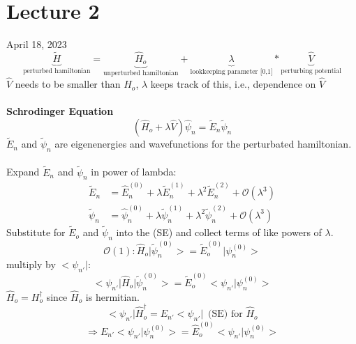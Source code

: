 \documentclass[12pt,fancychapters]{report}
\numberwithin{equation}{section}
\begin{document}
\section{Lecture 2}
April 18, 2023
$$\underbrace{\tilde{H}}_\text{perturbed hamiltonian} = \underbrace{\hat{H}_o}_\text{unperturbed hamiltonian}
+ \underbrace{\lambda}_\text{lookkeeping parameter [0,1]}* \underbrace{\hat{V}}_\text{perturbing potential}$$
\noindent
$\hat{V}$ needs to be smaller than $\hat{H}_o$, $\lambda$ keeps track of this, i.e., dependence on $\hat{V}$
\noindent
\\
\\
\textbf{Schrodinger Equation}
\begin{equation*}
	(\hat{H}_o + \lambda \hat{V}) \hat{\psi}_n = \tilde{E}_n \tilde{\psi}_n
\end{equation*}
$\tilde{E}_n$ and $\tilde{\psi}_n$ are eigenenergies and wavefunctions for the perturbated hamiltonian.
\\
\\
Expand $\tilde{E}_n$ and $\tilde{\psi}_n$ in power of lambda:
\begin{align*}
	\tilde{E}_n & = \hat{E}^{(0)}_n + \lambda \tilde{E}^{(1)}_n + \lambda^2 \tilde{E}^{(2)}_n + \mathcal{O}(\lambda^3)\\
	\tilde{\psi}_n & = \hat{\psi}^{(0)}_n + \lambda \tilde{\psi}^{(1)}_n + \lambda^2 \tilde{\psi}^{(2)}_n + \mathcal{O}(\lambda^3)
\end{align*}
Substitute for $\tilde{E}_o$ and $\tilde{\psi}_n$ into the (SE) and collect terms of like powers of $\lambda$.
\begin{equation*}
	\mathcal{O}(1): \hat{H}_o \big|\tilde{\psi}^{(0)}_n \big> = \tilde{E}^{(0)}_o \big| \psi_n^{(0)} \big>
\end{equation*}
multiply by $\big< \psi_{n'}\big|$:
\begin{equation*}
	\big< \psi_{n'}\big|\hat{H}_o \big|\tilde{\psi}^{(0)}_n \big> = \tilde{E}^{(0)}_o \big< \psi_{n'}\big| \psi_n^{(0)} \big>
\end{equation*}
$\hat{H}_o = H_o^\dag$ since $\hat{H}_o$ is hermitian.
\begin{equation*}
	\big < \psi_{n'} \big| \hat{H}^\dag_o = E_{n'} \big< \psi_{n'} \big|\,\,\,\text{(SE) for } \hat{H}_o
\end{equation*}
\begin{equation*}
	\Longrightarrow E_{n'} \big< \psi_{n'} \big| \psi_n^{(0)} \big> = 
	\hat{E}^{(0)}_o\big< \psi_{n'} \big| \psi_n^{(0)} \big> 
\end{equation*}
\end{document}
